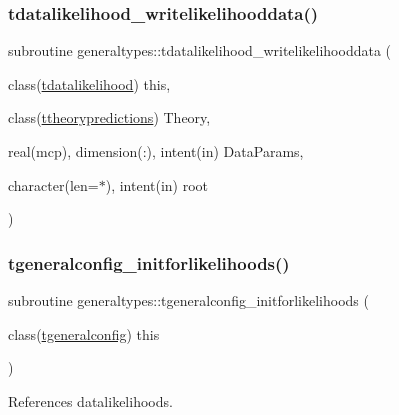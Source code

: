 \subsubsection{\texorpdfstring{tdatalikelihood\+\_\+writelikelihooddata()}{tdatalikelihood\_writelikelihooddata()}}
{\footnotesize\ttfamily subroutine generaltypes\+::tdatalikelihood\+\_\+writelikelihooddata (\begin{DoxyParamCaption}\item[{class(\mbox{\hyperlink{structgeneraltypes_1_1tdatalikelihood}{tdatalikelihood}})}]{this,  }\item[{class(\mbox{\hyperlink{structgeneraltypes_1_1ttheorypredictions}{ttheorypredictions}})}]{Theory,  }\item[{real(mcp), dimension(\+:), intent(in)}]{Data\+Params,  }\item[{character(len=$\ast$), intent(in)}]{root }\end{DoxyParamCaption})\hspace{0.3cm}{\ttfamily [private]}}

\mbox{\label{namespacegeneraltypes_ad67421d900a21e6dc1a5d34ea7bc77fe}} 
\subsubsection{\texorpdfstring{tgeneralconfig\+\_\+initforlikelihoods()}{tgeneralconfig\_initforlikelihoods()}}
{\footnotesize\ttfamily subroutine generaltypes\+::tgeneralconfig\+\_\+initforlikelihoods (\begin{DoxyParamCaption}\item[{class(\mbox{\hyperlink{structgeneraltypes_1_1tgeneralconfig}{tgeneralconfig}})}]{this }\end{DoxyParamCaption})\hspace{0.3cm}{\ttfamily [private]}}



References datalikelihoods.

\mbox{\label{namespacegeneraltypes_a510e50b9adaf980266f3c8160135f409}} 
